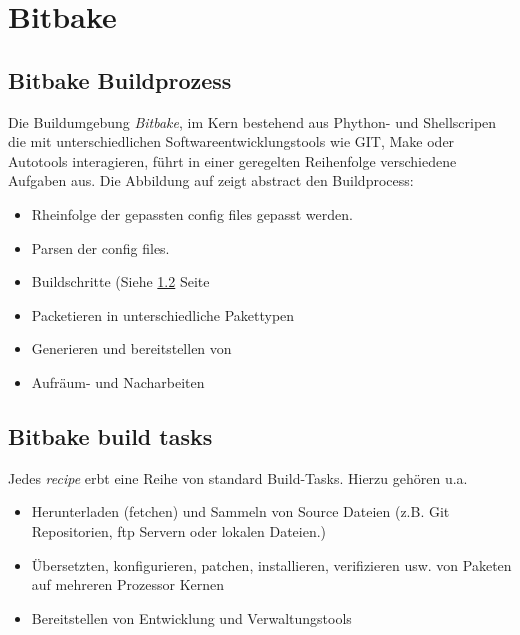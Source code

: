 

\chapter{Bitbake}%
\label{cha:bitbake}

\section{Bitbake Buildprozess}%
\label{sec:bitbake_buildprozess}



Die Buildumgebung \textit{Bitbake}, im Kern bestehend aus Phython- und
Shellscripen die mit unterschiedlichen Softwareentwicklungstools wie GIT, Make
oder Autotools interagieren, führt in einer geregelten Reihenfolge verschiedene
Aufgaben aus. Die Abbildung auf \cite[S. 20]{Gonzalez2018:Embedded_Linux_Development_Using_Yocto_Project_Cookbook_2nd}
zeigt abstract den Build\-process:

\begin{itemize}
    \item Rhein\-folge der gepassten config files gepasst werden.
    \item Parsen der config files.
    \item Buildschritte (Siehe \ref{sec:bitbake_build_tasks} Seite \pageref{sec:bitbake_build_tasks}
    \item Packetieren in unterschiedliche Pakettypen
    \item Generieren und bereitstellen von 
    \item Aufräum- und Nacharbeiten
\end{itemize}

\section{Bitbake build tasks}%
\label{sec:bitbake_build_tasks}

Jedes \textit{recipe} erbt eine Reihe von standard Build-Tasks.  Hierzu
gehören u.a.
\begin{itemize}
    \item Herunterladen (fetchen) und Sammeln von Source Dateien
        (z.B. Git Repositorien, ftp Servern oder lokalen Dateien.)
    \item Übersetzten, konfigurieren, patchen, installieren, verifizieren usw.
        von Paketen auf mehreren Prozessor Kernen
    \item Bereitstellen von Entwicklung und Verwaltungstools
\end{itemize}

